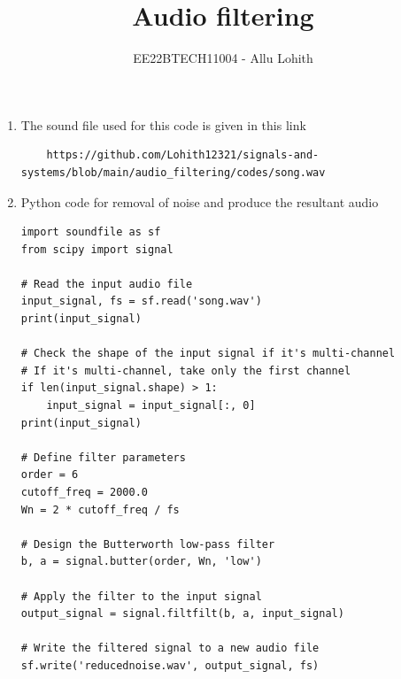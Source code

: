 \documentclass[journal,12pt,twocolumn]{IEEEtran}
\theoremstyle{remark}
\begin{document}

\vspace{3cm}

\title{Audio filtering}
\author{EE22BTECH11004 - Allu Lohith}

\maketitle
\newpage
\bigskip
\begin{enumerate}[label=\thesection.\arabic*
,ref=\thesection.\theenumi]
\section{Digital Filter}
\label{input_sound}
\item The sound file used for this code is given in this link\label{prob:audio_filter_problem}
\begin{lstlisting}
    https://github.com/Lohith12321/signals-and-systems/blob/main/audio_filtering/codes/song.wav
\end{lstlisting}
\item Python code for removal of noise and produce the resultant audio
\begin{lstlisting}
import soundfile as sf
from scipy import signal

# Read the input audio file
input_signal, fs = sf.read('song.wav')
print(input_signal)

# Check the shape of the input signal if it's multi-channel
# If it's multi-channel, take only the first channel
if len(input_signal.shape) > 1:
    input_signal = input_signal[:, 0]
print(input_signal)

# Define filter parameters
order = 6
cutoff_freq = 2000.0
Wn = 2 * cutoff_freq / fs

# Design the Butterworth low-pass filter
b, a = signal.butter(order, Wn, 'low')

# Apply the filter to the input signal
output_signal = signal.filtfilt(b, a, input_signal)

# Write the filtered signal to a new audio file
sf.write('reducednoise.wav', output_signal, fs)
\end{lstlisting}
    


\end{enumerate}
\end{document}
